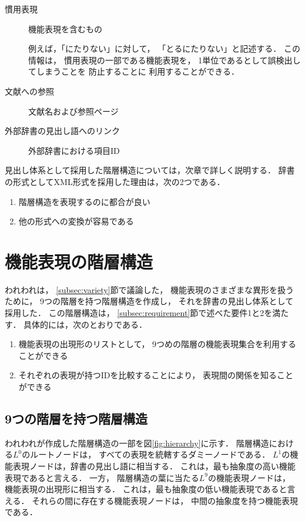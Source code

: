 \documentclass[japanese]{jnlp_1.3e}
\begin{document}
\begin{description}
\begin{description}
  \item[慣用表現] 機能表現を含むもの

             例えば，「にたりない」に対して，
             「とるにたりない」と記述する．
             この情報は，
             慣用表現の一部である機能表現を，
             1単位であるとして誤検出してしまうことを
             防止することに
             利用することができる．

  \item[文献への参照] 文献名および参照ページ

  \item[外部辞書の見出し語へのリンク] 外部辞書における項目ID
 \end{description}
\end{description}
見出し体系として採用した階層構造については，次章で詳しく説明する．
辞書の形式としてXML形式を採用した理由は，次の2つである．
\begin{enumerate}
\item 階層構造を表現するのに都合が良い
\item 他の形式への変換が容易である
\end{enumerate}




\section{機能表現の階層構造}
\label{sec:h}

われわれは，
\ref{subsec:variety}節で議論した，
機能表現のさまざまな異形を扱うために，
9つの階層を持つ階層構造を作成し，
それを辞書の見出し体系として採用した．
この階層構造は，
\ref{subsec:requirement}節で述べた要件1と2を満たす．
具体的には，次のとおりである．
\begin{enumerate}
\item 機能表現の出現形のリストとして，
      9つめの階層の機能表現集合を利用することができる
\item それぞれの表現が持つIDを比較することにより，
      表現間の関係を知ることができる
\end{enumerate}      

\subsection{9つの階層を持つ階層構造}
\label{subsec:hierarchy}

われわれが作成した階層構造の一部を図\ref{fig:hierarchy}に示す．
階層構造における$L^0$のルートノードは，
すべての表現を統轄するダミーノードである．
$L^1$の機能表現ノードは，辞書の見出し語に相当する．
これは，最も抽象度の高い機能表現であると言える．
一方，
階層構造の葉に当たる$L^9$の機能表現ノードは，
機能表現の出現形に相当する．
これは，最も抽象度の低い機能表現であると言える．
それらの間に存在する機能表現ノードは，
中間の抽象度を持つ機能表現である．
\end{document}
